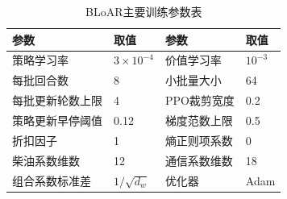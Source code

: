 \begin{table}[H]
 \centering
 \caption{BLoAR主要训练参数表}
 \label{tab:formal-ch2-training}
 \label{tab:ch2-training-parameters}
 \begingroup\small
 \begin{tabular}{llll}
  \toprule
  参数 & 取值 & 参数 & 取值 \\
  \midrule
  策略学习率 & \(3\times10^{-4}\) & 价值学习率 & \(10^{-3}\) \\
  每批回合数 & 8 & 小批量大小 & 64 \\
  每批更新轮数上限 & 4 & PPO裁剪宽度 & 0.2 \\
  策略更新早停阈值 & 0.12 & 梯度范数上限 & 0.5 \\
  折扣因子 & 1 & 熵正则项系数 & 0 \\
  柴油系数维数 & 12 & 通信系数维数 & 18 \\
  组合系数标准差 & \(1/\sqrt{d_w}\) & 优化器 & Adam \\
  \bottomrule
 \end{tabular}
 \endgroup
\end{table}
